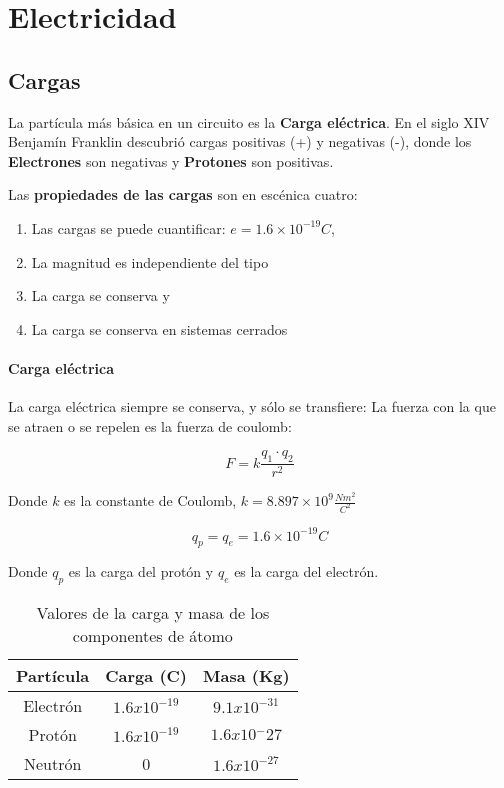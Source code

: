 \chapter{Electricidad}

\section{Cargas}

\begin{definition}[carga]
	La partícula más básica en un circuito es la \textbf{Carga eléctrica}. En el siglo XIV
	Benjamín Franklin descubrió cargas positivas (+) y negativas (-), donde los
\textbf{Electrones} son negativas y \textbf{Protones} son positivas.\cite{boylestad2004introduccion}
\end{definition}


Las \textbf{propiedades de las cargas}
son en escénica cuatro: 

\begin{enumerate}
    \item Las cargas se puede cuantificar: $e=1.6\times 10^{-19}C$, \item La magnitud es independiente del tipo \item La carga se conserva y \item La carga se conserva en sistemas cerrados
\end{enumerate}

\subsubsection{Carga eléctrica}
La carga eléctrica siempre se conserva, y sólo se transfiere: La fuerza con la que se atraen o se repelen
es la fuerza de coulomb:

\begin{equation}
	F = k\frac{q_{1}\cdot q_{2}}{r^2 }
	\label{EqCoulomb}
\end{equation}

Donde $k$ es la constante de Coulomb, $k=8{.}897\times10^9 \frac{Nm^2 }{C^2 }$

\begin{equation}
	q_{p} = q_{e} = 1{.}6\times10^{-19} C
\end{equation}

Donde $q_{p}$ es la carga del protón y $q_{e}$ es la carga del electrón.

\begin{table}[h!]
	\centering
	\begin{tabular}{|c|c|c|}
		\hline
		Partícula & Carga (C)        & Masa (Kg)        \\ \hline
		Electrón  & $1{.}6x10^{-19}$ & $9{.}1x10^{-31}$ \\ \hline
		Protón    & $1{.}6x10^{-19}$ & $1{.}6x10{^-27}$ \\ \hline
		Neutrón   & 0                & $1{.}6x10^{-27}$ \\ \hline
	\end{tabular}
	\caption{Valores de la carga y masa de los componentes de átomo}
	\label{tabelec1}
\end{table}

